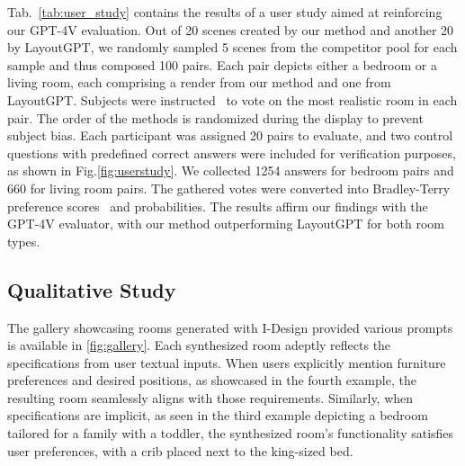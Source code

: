 \documentclass[runningheads]{llncs}
\newcommand{\methodname}{I-Design\xspace}
\begin{document}


Tab.~\ref{tab:user_study} contains the results of a user study aimed at reinforcing our
GPT-4V evaluation. 
Out of 20 scenes created by our method and another 20 by LayoutGPT\cite{feng2023layoutgpt}, we randomly sampled 5 scenes from the competitor pool for each sample and thus composed 100 pairs.
Each pair depicts either a bedroom or a living room, each comprising a render from our method and one from LayoutGPT. 
Subjects were instructed~\cite{subjectify} to vote on the most realistic room in each pair. The order of the methods is randomized during the display to prevent subject bias. Each participant was assigned 20 pairs to evaluate, and two control questions with predefined correct answers were included for verification purposes, as shown in Fig.\ref{fig:userstudy}. We collected 1254 answers for bedroom pairs and 660 for living room pairs. The gathered votes were converted into Bradley-Terry preference scores~\cite{bradley1952rank} and probabilities. 
The results affirm our findings with the GPT-4V evaluator, with our method outperforming LayoutGPT for both room types.

\begin{table}[th]
\caption{
\textbf{Subjective Study} of user preferences between LayoutGPT and I-Design. These results confirm the higher realism of our layouts and the reliability of the proposed GPT-4V evaluation scheme.
}
\label{tab:user_study}
\begin{center}
\vspace{-1.5em}
\resizebox{0.8\linewidth}{!}{

}
\vspace{-1.5em}
\end{center}
\end{table}

\subsection{Qualitative Study}

The gallery showcasing rooms generated with \methodname provided various prompts is available in \cref{fig:gallery}. Each synthesized room adeptly reflects the specifications from user textual inputs. When users explicitly mention furniture preferences and desired positions, as showcased in the fourth example, the resulting room seamlessly aligns with those requirements. Similarly, when specifications are implicit, as seen in the third example depicting a bedroom tailored for a family with a toddler, the synthesized room's functionality satisfies user preferences, with a crib placed next to the king-sized bed.
\end{document}
